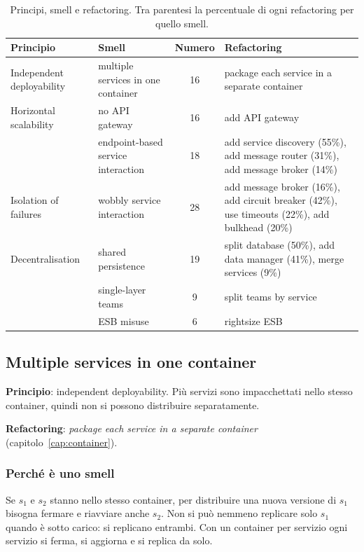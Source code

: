\begin{table}[ht]
\centering
\small
\caption{Principi, smell e refactoring. Tra parentesi la percentuale di ogni refactoring per quello smell.}
\label{tab:smell-tassonomia}
\begin{tabularx}{\linewidth}{>{\raggedright\arraybackslash}p{2.6cm}>{\raggedright\arraybackslash}p{3.4cm}cX}
\toprule
Principio & Smell & Numero & Refactoring \\
\midrule
Independent deployability & multiple services in one container & 16 & package each service in a separate
  container \\
Horizontal scalability & no API gateway & 16 & add API gateway \\
 & endpoint-based service interaction & 18 & add service discovery (55\%), add message router (31\%), add message
  broker (14\%) \\
Isolation of failures & wobbly service interaction & 28 & add message broker (16\%), add circuit breaker (42\%), use
  timeouts (22\%), add bulkhead (20\%) \\
Decentralisation & shared persistence & 19 & split database (50\%), add data manager (41\%), merge services (9\%) \\
 & single-layer teams & 9 & split teams by service \\
 & ESB misuse & 6 & rightsize ESB \\
\bottomrule
\end{tabularx}
\end{table}

\subsection{Multiple services in one container}

\textbf{Principio}: independent deployability. Più servizi sono impacchettati nello stesso container, quindi non si
possono distribuire separatamente.

\textbf{Refactoring}: \emph{package each service in a separate container} (capitolo~\ref{cap:container}).

\subsubsection{Perché è uno smell\aggiunta}
Se $s_1$ e $s_2$ stanno nello stesso container, per distribuire una nuova versione di $s_1$ bisogna fermare e
riavviare anche $s_2$. Non si può nemmeno replicare solo $s_1$ quando è sotto carico: si replicano entrambi. Con un
container per servizio ogni servizio si ferma, si aggiorna e si replica da solo.

